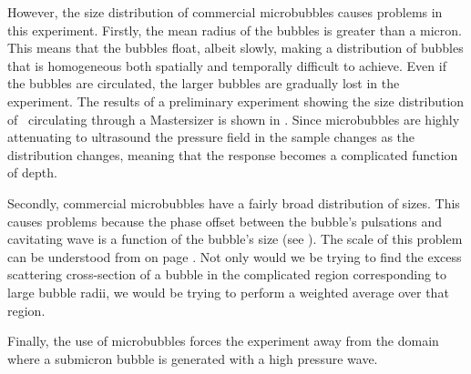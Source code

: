 {  However, the size distribution of commercial microbubbles causes problems in this experiment.
  Firstly, the mean radius of the bubbles is greater than a micron.
  This means that the bubbles float, albeit slowly, making a distribution of bubbles
  that is homogeneous both spatially and temporally difficult to achieve.
  Even if the bubbles are circulated, the larger bubbles are gradually lost in the experiment.
  The results of a preliminary experiment showing the size distribution of \Sonovue\ circulating 
   through a Mastersizer is shown in .
  Since microbubbles are highly attenuating to ultrasound 
  the pressure field in the sample changes as the distribution changes,
  meaning that the response becomes a complicated function of depth.


  Secondly, commercial microbubbles have a fairly broad distribution of sizes.
  This causes problems because the phase offset between the bubble's pulsations and  cavitating wave 
  is a function of the bubble's size (see ).
  The scale of this problem can be understood from  on page \pageref{fig:phase_radial}.
  Not only would we be trying to find the excess scattering cross-section of  a bubble in the complicated region
  corresponding to large bubble radii, we would be trying to perform a weighted average over that region.

Finally, the use of microbubbles forces the experiment away from the domain where a submicron bubble is generated  with a high pressure wave.
  




}
